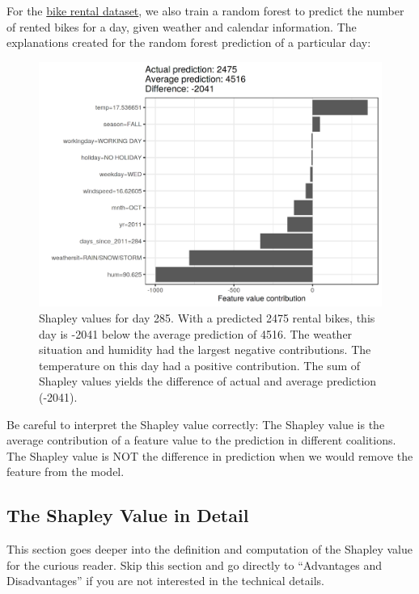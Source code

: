 \documentclass[12pt,]{krantz}
\begin{document}
For the \protect\hyperlink{bike-data}{bike rental dataset}, we also
train a random forest to predict the number of rented bikes for a day,
given weather and calendar information. The explanations created for the
random forest prediction of a particular day:

\begin{figure}

{\centering \includegraphics[width=\textwidth]{images/shapley-bike-plot-1} 

}

\caption{Shapley values for day 285. With a predicted 2475 rental bikes, this day is -2041 below the average prediction of 4516. The weather situation and humidity had the largest negative contributions. The temperature on this day had a positive contribution. The sum of Shapley values yields the difference of actual and average prediction (-2041).}\label{fig:shapley-bike-plot}
\end{figure}

Be careful to interpret the Shapley value correctly: The Shapley value
is the average contribution of a feature value to the prediction in
different coalitions. The Shapley value is NOT the difference in
prediction when we would remove the feature from the model.

\subsection{The Shapley Value in
Detail}\label{the-shapley-value-in-detail}

This section goes deeper into the definition and computation of the
Shapley value for the curious reader. Skip this section and go directly
to ``Advantages and Disadvantages'' if you are not interested in the
technical details.
\end{document}
